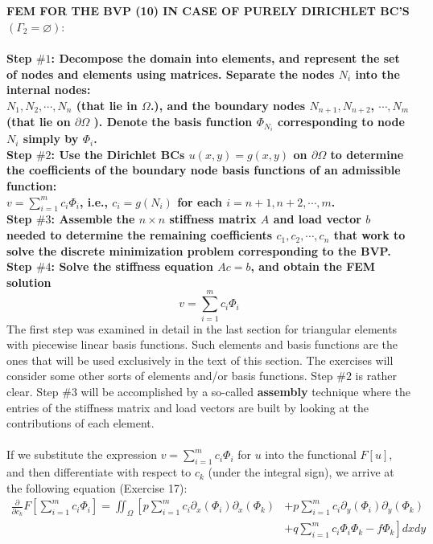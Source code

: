 \documentclass[../main.tex]{subfiles}
\begin{document}
\\
\\
\textbf{FEM FOR THE BVP (10) IN CASE OF PURELY DIRICHLET BC'S $\left(\Gamma_{2}=\varnothing\right):$
\\
\\ 
Step $\#1$: Decompose the domain into elements, and represent the set of nodes and elements using matrices. Separate the nodes $N_{i}$ into the internal nodes:
\\
$N_{1}, N_{2}, \cdots, N_{n}$ (that lie in $\Omega$.), and the boundary nodes $N_{n+1}, N_{n+2}$, $\cdots, N_{m}$ (that lie on $\partial \Omega$ ). Denote the basis function $\Phi_{N_{i}}$ corresponding to node $N_{i}$ simply by $\Phi_{i}$.
\\
Step $\#2$: Use the Dirichlet BCs $u(x, y)=g(x, y)$ on $\partial \Omega$ to determine the coefficients of the boundary node basis functions of an admissible function:
\\
$v=\sum_{i=1}^{m} c_{i} \Phi_{i}$, i.e., $c_{i}=g\left(N_{i}\right)$ for each $i=n+1, n+2, \cdots, m$.
\\
Step $\#3$: Assemble the $n \times n$ stiffness matrix $A$ and load vector $b$ needed to determine the remaining coefficients $c_{1}, c_{2}, \cdots, c_{n}$ that work to solve the discrete minimization problem corresponding to the BVP.
\\
Step $\#4$: Solve the stiffness equation $A c=b$, and obtain the FEM solution $$v=\sum_{i=1}^{m} c_{i} \Phi_{i}$$}
The first step was examined in detail in the last section for triangular elements with piecewise linear basis functions. Such elements and basis functions are the ones that will be used exclusively in the text of this section. The exercises will consider some other sorts of elements and/or basis functions. Step $\# 2$ is rather clear. Step $\#3$ will be accomplished by a so-called \textbf{assembly} technique where the entries of the stiffness matrix and load vectors are built by looking at the contributions of each element.
\\
\\
If we substitute the expression $v=\sum_{i=1}^{m} c_{i} \Phi_{i}$ for $u$ into the functional $F[u]$, and then differentiate with respect to $c_{k}$ (under the integral sign), we arrive at the following equation (Exercise 17):
\begin{equation}
\begin{aligned}
\frac{\partial}{\partial c_{k}} F\left[\sum_{i=1}^{m} c_{i} \Phi_{i}\right]=\iint_{\Omega}\left[p \sum_{i=1}^{m} c_{i} \partial_{x}\left(\Phi_{i}\right) \partial_{x}\left(\Phi_{k}\right)\right.&+p \sum_{i=1}^{m} c_{i} \partial_{y}\left(\Phi_{i}\right) \partial_{y}\left(\Phi_{k}\right) \\
&\left.+q \sum_{i=1}^{m} c_{i} \Phi_{i} \Phi_{k}-f \Phi_{k}\right] d x d y
\end{aligned}
\end{equation}
\end{document}
